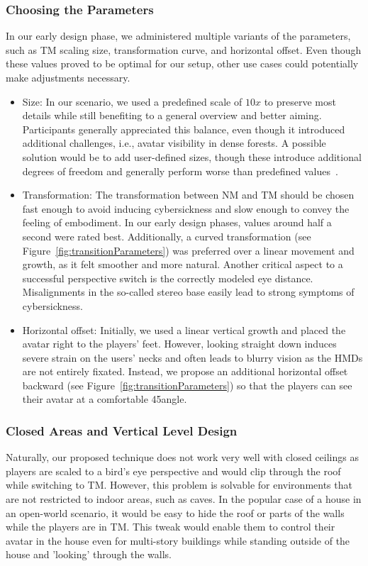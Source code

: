 \documentclass{sigchi}
\begin{document}
\subsubsection{Choosing the Parameters}
In our early design phase, we administered multiple variants of the parameters, such as TM scaling size, transformation curve, and horizontal offset. Even though these values proved to be optimal for our setup, other use cases could potentially make adjustments necessary.
\begin{itemize}
  \setlength{\itemsep}{2pt}
  \setlength{\parskip}{0pt}
  \setlength{\parsep}{0pt}
\item Size: In our scenario, we used a predefined scale of $10x$ to preserve most details while still benefiting to a general overview and better aiming. Participants generally appreciated this balance, even though it introduced additional challenges, i.e., avatar visibility in dense forests. A possible solution would be to add user-defined sizes, though these introduce additional degrees of freedom and generally perform worse than predefined values~\cite{kopper2006design}.
\item Transformation: The transformation between NM and TM should be chosen fast enough to avoid inducing cybersickness and slow enough to convey the feeling of embodiment. In our early design phases, values around half a second were rated best. Additionally, a curved transformation (see Figure~\ref{fig:transitionParameters}) was preferred over a linear movement and growth, as it felt smoother and more natural. Another critical aspect to a successful perspective switch is the correctly modeled eye distance. Misalignments in the so-called stereo base easily lead to strong symptoms of cybersickness.
\item Horizontal offset: Initially, we used a linear vertical growth and placed the avatar right to the players' feet. However, looking straight down induces severe strain on the users' necks and often leads to blurry vision as the HMDs are not entirely fixated. Instead, we propose an additional horizontal offset backward (see Figure~\ref{fig:transitionParameters}) so that the players can see their avatar at a comfortable 45\textdegree angle.
\end{itemize}

\subsubsection{Closed Areas and Vertical Level Design}
Naturally, our proposed technique does not work very well with closed ceilings as players are scaled to a bird's eye perspective and would clip through the roof while switching to TM. However, this problem is solvable for environments that are not restricted to indoor areas, such as caves. In the popular case of a house in an open-world scenario, it would be easy to hide the roof or parts of the walls while the players are in TM. This tweak would enable them to control their avatar in the house even for multi-story buildings while standing outside of the house and 'looking' through the walls.
\end{document}
